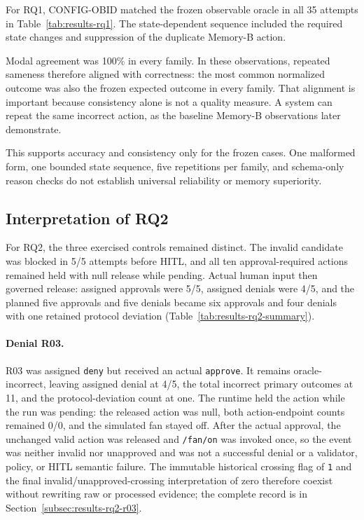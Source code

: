 For RQ1, CONFIG-OBID matched the frozen observable oracle in all 35 attempts in
Table~\ref{tab:results-rq1}. The state-dependent sequence included the required
state changes and suppression of the duplicate Memory-B action.

Modal agreement was 100\% in every family. In these observations, repeated
sameness therefore aligned with correctness: the most common normalized
outcome was also the frozen expected outcome in every family. That alignment is
important because consistency alone is not a quality measure. A system can
repeat the same incorrect action, as the baseline Memory-B observations later
demonstrate.

This supports accuracy and consistency only for the frozen cases. One malformed
form, one bounded state sequence, five repetitions per family, and schema-only
reason checks do not establish universal reliability or memory superiority.

\subsection{Interpretation of RQ2}\label{subsec:discussion-rq2}

For RQ2, the three exercised controls remained distinct. The invalid candidate
was blocked in 5/5 attempts before HITL, and all ten approval-required actions
remained held with null release while pending. Actual human input then governed
release: assigned approvals were 5/5, assigned denials were 4/5, and the planned
five approvals and five denials became six approvals and four denials with one
retained protocol deviation (Table~\ref{tab:results-rq2-summary}).

\paragraph{Denial R03.}
R03 was assigned \texttt{deny} but received an actual \texttt{approve}. It
remains oracle-incorrect, leaving assigned denial at 4/5, the total incorrect
primary outcomes at 11, and the protocol-deviation count at one. The runtime
held the action while the run was pending: the released action was null, both
action-endpoint counts remained 0/0, and the simulated fan stayed off. After
the actual approval, the unchanged valid action was released and
\texttt{/fan/on} was invoked once, so the event was neither invalid nor
unapproved and was not a successful denial or a validator, policy, or HITL
semantic failure. The immutable historical crossing flag of
\texttt{1} and the final invalid/unapproved-crossing interpretation of zero
therefore coexist without rewriting raw or processed evidence; the complete
record is in Section~\ref{subsec:results-rq2-r03}.

